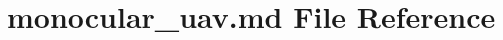 \hypertarget{monocular__uav_8md}{}\section{monocular\+\_\+uav.\+md File Reference}
\label{monocular__uav_8md}
